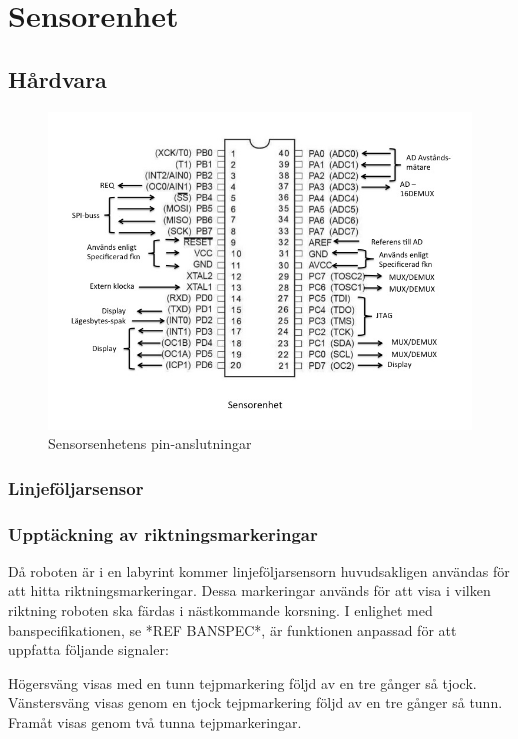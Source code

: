 \section{Sensorenhet}

\subsection{Hårdvara}

\begin{figure}[H]
  \centering
 \includegraphics[angle=0,scale=0.5]{bilder/PIN_sensor.jpg}
  \caption{Sensorsenhetens pin-anslutningar}
  \label{fig:PINsensor}
\end{figure}


\subsubsection{Linjeföljarsensor}

\subsubsection{Upptäckning av riktningsmarkeringar}
\label{riktmark}
Då roboten är i en labyrint kommer linjeföljarsensorn huvudsakligen användas för att hitta riktningsmarkeringar. Dessa markeringar används för att visa i vilken riktning roboten ska färdas i nästkommande korsning.  I enlighet med banspecifikationen, se *REF BANSPEC*, är funktionen anpassad för att uppfatta följande signaler:

Högersväng visas med en tunn tejpmarkering följd av en tre gånger så tjock.
Vänstersväng visas genom en tjock tejpmarkering följd av en tre gånger så tunn.
Framåt visas genom två tunna tejpmarkeringar.

